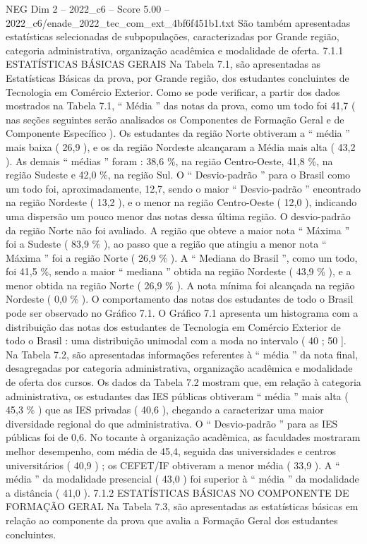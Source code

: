 \begin{textsample}{NEG Dim 2 – 2022\_c6 – Score 5.00 – 2022\_c6/enade\_2022\_tec\_com\_ext\_4bf6f451b1.txt}
São também apresentadas estatísticas selecionadas de subpopulações, caracterizadas por Grande região, categoria administrativa, organização acadêmica e modalidade de oferta. 7.1.1 ESTATÍSTICAS BÁSICAS GERAIS Na Tabela 7.1, são apresentadas as Estatísticas Básicas da prova, por Grande região, dos estudantes concluintes de Tecnologia em Comércio Exterior.
Como se pode verificar, a partir dos dados mostrados na Tabela 7.1, “ Média ” das notas da prova, como um todo foi 41,7 ( nas seções seguintes serão analisados os Componentes de Formação Geral e de Componente Específico ).
Os estudantes da região Norte obtiveram a “ média ” mais baixa ( 26,9 ), e os da região Nordeste alcançaram a Média mais alta ( 43,2 ).
As demais “ médias ” foram : 38,6 \%, na região Centro-Oeste, 41,8 \%, na região Sudeste e 42,0 \%, na região Sul.
O “ Desvio-padrão ” para o Brasil como um todo foi, aproximadamente, 12,7, sendo o maior “ Desvio-padrão ” encontrado na região Nordeste ( 13,2 ), e o menor na região Centro-Oeste ( 12,0 ), indicando uma dispersão um pouco menor das notas dessa última região.
O desvio-padrão da região Norte não foi avaliado.
A região que obteve a maior nota “ Máxima ” foi a Sudeste ( 83,9 \% ), ao passo que a região que atingiu a menor nota “ Máxima ” foi a região Norte ( 26,9 \% ).
A “ Mediana do Brasil ”, como um todo, foi 41,5 \%, sendo a maior “ mediana ” obtida na região Nordeste ( 43,9 \% ), e a menor obtida na região Norte ( 26,9 \% ).
A nota mínima foi alcançada na região Nordeste ( 0,0 \% ).
O comportamento das notas dos estudantes de todo o Brasil pode ser observado no Gráfico 7.1.
O Gráfico 7.1 apresenta um histograma com a distribuição das notas dos estudantes de Tecnologia em Comércio Exterior de todo o Brasil : uma distribuição unimodal com a moda no intervalo ( 40 ; 50 ].
Na Tabela 7.2, são apresentadas informações referentes à “ média ” da nota final, desagregadas por categoria administrativa, organização acadêmica e modalidade de oferta dos cursos.
Os dados da Tabela 7.2 mostram que, em relação à categoria administrativa, os estudantes das IES públicas obtiveram “ média ” mais alta ( 45,3 \% ) que as IES privadas ( 40,6 ), chegando a caracterizar uma maior diversidade regional do que administrativa.
O “ Desvio-padrão ” para as IES públicas foi de 0,6.
No tocante à organização acadêmica, as faculdades mostraram melhor desempenho, com média de 45,4, seguida das universidades e centros universitários ( 40,9 ) ; os CEFET/IF obtiveram a menor média ( 33,9 ).
A “ média ” da modalidade presencial ( 43,0 ) foi superior à “ média ” da modalidade a distância ( 41,0 ). 7.1.2 ESTATÍSTICAS BÁSICAS NO COMPONENTE DE FORMAÇÃO GERAL Na Tabela 7.3, são apresentadas as estatísticas básicas em relação ao componente da prova que avalia a Formação Geral dos estudantes concluintes.

\end{textsample}
